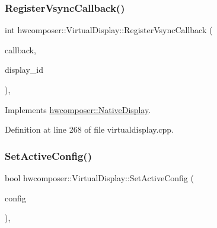 \mbox{\label{classhwcomposer_1_1VirtualDisplay_ac7c9e2ca6a7f2e4f4acef44e4dd14ea6}} 
\subsubsection{\texorpdfstring{Register\+Vsync\+Callback()}{RegisterVsyncCallback()}}
{\footnotesize\ttfamily int hwcomposer\+::\+Virtual\+Display\+::\+Register\+Vsync\+Callback (\begin{DoxyParamCaption}\item[{std\+::shared\+\_\+ptr$<$ \mbox{\hyperlink{classhwcomposer_1_1VsyncCallback}{Vsync\+Callback}} $>$}]{callback,  }\item[{uint32\+\_\+t}]{display\+\_\+id }\end{DoxyParamCaption})\hspace{0.3cm}{\ttfamily [override]}, {\ttfamily [virtual]}}



Implements \mbox{\hyperlink{classhwcomposer_1_1NativeDisplay_a0732e4b24a348aaf1e0b801b9a5f3c39}{hwcomposer\+::\+Native\+Display}}.



Definition at line 268 of file virtualdisplay.\+cpp.


\begin{DoxyCode}{0}
\end{DoxyCode}
\mbox{\label{classhwcomposer_1_1VirtualDisplay_ae8a48c2d2449d3185b1653074e74e171}} 
\subsubsection{\texorpdfstring{Set\+Active\+Config()}{SetActiveConfig()}}
{\footnotesize\ttfamily bool hwcomposer\+::\+Virtual\+Display\+::\+Set\+Active\+Config (\begin{DoxyParamCaption}\item[{uint32\+\_\+t}]{config }\end{DoxyParamCaption})\hspace{0.3cm}{\ttfamily [override]}, {\ttfamily [virtual]}}



